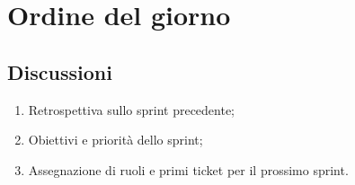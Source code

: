 \section{Ordine del giorno} \label{sec:agenda}
\subsection{Discussioni} \label{subsec:discussione}
\begin{enumerate}
    \item Retrospettiva sullo sprint precedente;
    \item Obiettivi e priorità dello sprint;
    \item Assegnazione di ruoli e primi ticket per il prossimo sprint.
\end{enumerate}
